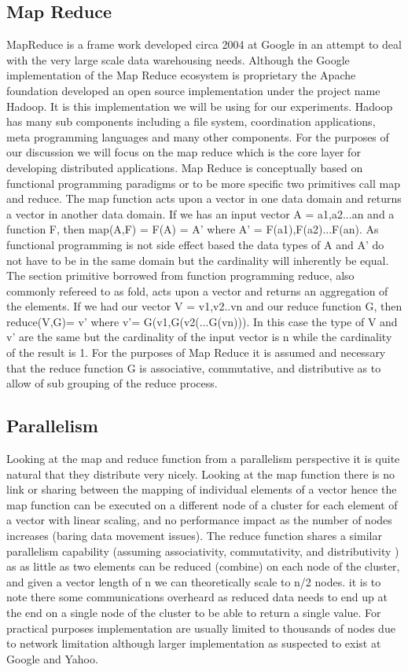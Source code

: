 \documentclass[runningheads]{llncs}
\begin{document}
\subsection*{Map Reduce}

MapReduce \cite{Google04} is a frame work developed circa 2004 at Google in an attempt to deal with the very large scale data warehousing needs. Although the Google implementation of the Map Reduce ecosystem is proprietary the Apache foundation developed an open source implementation under the project name Hadoop. It is this implementation we will be using for our experiments. Hadoop has many sub components including a file system, coordination applications, meta programming languages and many other components. For the purposes of our discussion we will focus on the map reduce which is the core layer for developing distributed applications. Map Reduce is conceptually based on functional programming paradigms or to be more specific two primitives call map and reduce. The map function acts upon a vector in one data domain and returns a vector in another data domain. If we has an input vector A = { a1,a2...an } and a function F, then map(A,F) = F(A) = A’ where A’ = {F(a1),F(a2)...F(an)}. As functional programming is not side effect based the data types of A and A’ do not have to be in the same domain but the cardinality will inherently be equal. The section primitive borrowed from function programming reduce, also commonly refereed to as fold, acts upon a vector and returns an aggregation of the elements. If we had our vector V = {v1,v2..vn} and our reduce function G, then reduce(V,G)= v’ where v’= G(v1,G(v2(...G(vn))). In this case the type of V and v’ are the same but the cardinality of the input vector is n while the cardinality of the result is 1. For the purposes of Map Reduce it is assumed and necessary that the reduce function G is associative, commutative, and distributive as to allow of sub grouping of the reduce process. 

\subsection*{Parallelism}

Looking at the map and reduce function from a parallelism perspective it is quite natural that they distribute very nicely. Looking at the map function there is no link or sharing between the mapping of individual elements of a vector hence the map function can be executed on a different node of a cluster for each element of a vector with linear scaling, and no performance impact as the number of nodes increases (baring data movement issues). The reduce function shares a similar parallelism capability (assuming associativity, commutativity, and distributivity ) as as little as two elements can be reduced (combine) on each node of the cluster, and given a vector length of n we can theoretically scale to n/2 nodes. it is to note there some communications overheard as reduced data needs to end up at the end on a single node of the cluster to be able to return a single value.  For practical purposes implementation are usually limited to thousands of nodes due to network limitation although larger implementation as suspected to exist at Google and Yahoo.
\end{document}
